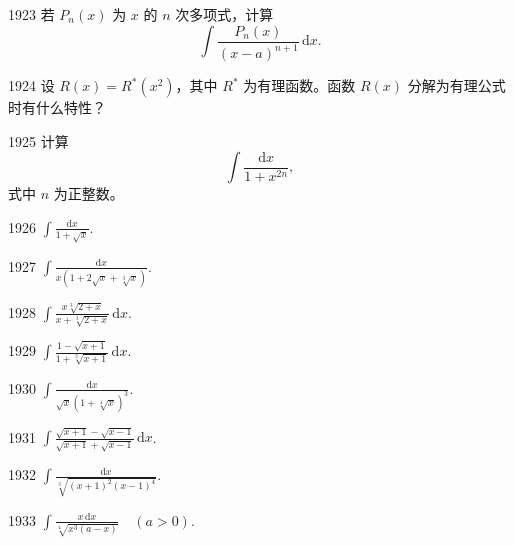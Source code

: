 \begin{prob}[M]{1923}
若 $P_n(x)$ 为 $x$ 的 $n$ 次多项式，计算
\[
\int \frac{P_n(x)}{(x - a)^{n + 1}}\,\mathrm{d}x.
\]
\end{prob}

\begin{prob}[M]{1924}
设 $R(x) = R^*(x^2)$，其中 $R^*$ 为有理函数。函数 $R(x)$ 分解为有理公式时有什么特性？
\end{prob}

\begin{prob}[M]{1925}
计算
\[
\int \frac{\mathrm{d}x}{1 + x^{2n}},
\]
式中 $n$ 为正整数。
\end{prob}



\begin{prob}[S]{1926}
$\displaystyle \int \frac{\mathrm{d}x}{1 + \sqrt{x}}$.
\end{prob}

\begin{prob}[S]{1927}
$\displaystyle \int \frac{\mathrm{d}x}{x(1 + 2\sqrt{x} + \sqrt[3]{x})}$.
\end{prob}

\begin{prob}[S]{1928}
$\displaystyle \int \frac{x\sqrt[3]{2 + x}}{x + \sqrt[3]{2 + x}}\,\mathrm{d}x$.
\end{prob}

\begin{prob}[S]{1929}
$\displaystyle \int \frac{1 - \sqrt{x + 1}}{1 + \sqrt[3]{x + 1}}\,\mathrm{d}x$.
\end{prob}

\begin{prob}[S]{1930}
$\displaystyle \int \frac{\mathrm{d}x}{\sqrt{x}(1 + \sqrt[4]{x})^3}$.
\end{prob}

\begin{prob}[S]{1931}
$\displaystyle \int \frac{\sqrt{x + 1} - \sqrt{x - 1}}{\sqrt{x + 1} + \sqrt{x - 1}}\,\mathrm{d}x$.
\end{prob}

\begin{prob}[S]{1932}
$\displaystyle \int \frac{\mathrm{d}x}{\sqrt[3]{(x + 1)^2(x - 1)^4}}$.
\end{prob}

\begin{prob}[S]{1933}
$\displaystyle \int \frac{x\,\mathrm{d}x}{\sqrt[4]{x^3(a - x)}} \quad (a > 0)$.
\end{prob}


